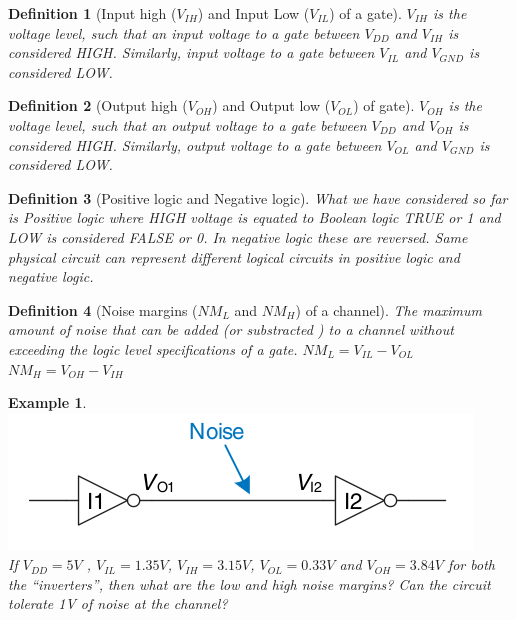 \documentclass{article}
\newtheorem{example}{Example}
\newtheorem{definition}{Definition}
\newcommand{\notescol}{white}
\begin{document}
\begin{definition}[Input high ($V_{IH}$) and Input Low ($V_{IL}$) of a gate]
  \color{\notescol}
  $V_{IH}$ is the voltage level, such that an input voltage to a gate between $V_{DD}$
  and $V_{IH}$ is considered \emph{HIGH}. Similarly, input voltage to a gate
  between $V_{IL}$ and $V_{GND}$ is considered \emph{LOW}.
\end{definition}

\begin{definition}[Output high ($V_{OH}$) and Output low ($V_{OL}$) of gate]
  \color{\notescol}
  $V_{OH}$ is the voltage level, such that an output voltage to a gate between $V_{DD}$
  and $V_{OH}$ is considered \emph{HIGH}. Similarly, output voltage to a gate
  between $V_{OL}$ and $V_{GND}$ is considered \emph{LOW}.
\end{definition}

\begin{definition}[Positive logic and Negative logic]
  \color{\notescol}
  What we have considered so far is Positive logic where \emph{HIGH} voltage is
  equated to Boolean logic \emph{TRUE} or \emph{1} and \emph{LOW} is considered
  \emph{FALSE} or \emph{0}. In negative logic these are reversed. Same physical
  circuit can represent different logical circuits in positive logic and
  negative logic.
\end{definition}

\begin{definition}[Noise margins ($NM_L$ and $NM_H$) of a channel]
  \color{\notescol}
  The maximum amount of noise that can be added (or substracted ) to a channel
  without exceeding the logic level specifications of a gate.  
  $NM_L  = V_{IL} - V_{OL}$ \\
  $NM_H  = V_{OH} - V_{IH}$
\end{definition}

\begin{example}
  \includegraphics[width=0.3\linewidth]{fig/fig1.24-noise-margins.png}\\
  If $V_{DD} = 5V$ , $V_{IL} = 1.35V$, $V_{IH} = 3.15V$, $V_{OL} = 0.33V$ and
  $V_{OH} = 3.84V$ for both the ``inverters'', then what are the low and high
  noise margins? Can the circuit tolerate 1V of noise at the channel?
\end{example}
\vspace{10em}
\end{document}
